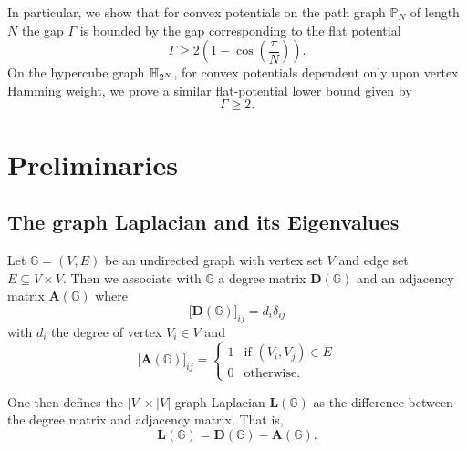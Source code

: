   In particular, we show that for convex potentials on the path graph $\mathbb{P}_N$ of length $N$ the gap $\Gamma$ is bounded by the gap corresponding to the flat potential
  \begin{equation}
    \Gamma \geq 2\left(1-\cos\left(\frac{\pi}{N}\right)\right).
  \end{equation}
  On the hypercube graph $\mathbb{H}_{2^N}$, for convex potentials dependent only upon vertex Hamming weight, we prove a similar flat-potential lower bound given by
    \begin{equation}
    \Gamma \geq 2.
  \end{equation}

\section{Preliminaries}\label{sec:prelim}
  \subsection{The graph Laplacian and its Eigenvalues}\label{sec:prelim_eigenvalues}
    Let $\mathbb{G}=(V,E)$ be an undirected graph with vertex set $V$ and edge set $E\subseteq V \times V$. Then we associate with $\mathbb{G}$ a degree matrix $\mathbf{D}(\mathbb{G})$ and an adjacency matrix $\mathbf{A}(\mathbb{G})$ where
    \begin{equation}
      \big[\mathbf{D}(\mathbb{G})\big]_{ij} = d_i \delta_{ij}
    \end{equation}
    with $d_i$ the degree of vertex $V_i \in V$ and
    \begin{equation}
      \big[\mathbf{A}(\mathbb{G})\big]_{ij} = \begin{cases}
						1 & \text{if $(V_i,V_j) \in E$} \\
						0 & \text{otherwise}.
					      \end{cases}
    \end{equation}

    One then defines the $\lvert V \rvert \times \lvert V \rvert$ graph Laplacian $\mathbf{L}(\mathbb{G})$ as the difference between the degree matrix and adjacency matrix. That is,
    \begin{equation}
      \mathbf{L}(\mathbb{G}) = \mathbf{D}(\mathbb{G}) - \mathbf{A}(\mathbb{G}).
    \end{equation}


